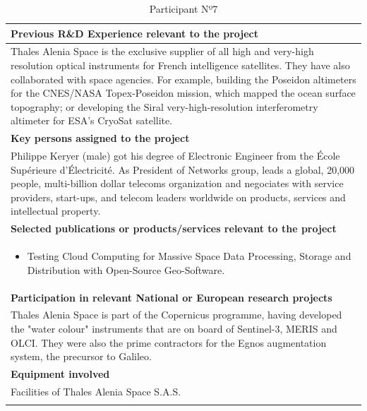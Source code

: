 \begin{longtable}[H]{|p{0.7cm}|p{4cm}|p{7cm}|p{1.3cm}|}
	\multicolumn{4}{|p{13cm}|}{\textbf{Previous R\&D Experience relevant to the project}}  \\ \hline
	
	\multicolumn{4}{|p{14.5cm}|}{Thales Alenia Space is the exclusive supplier of all high and very-high resolution optical instruments for French intelligence satellites. They have also collaborated with space agencies. For example, building the Poseidon altimeters for the CNES/NASA Topex-Poseidon mission, which mapped the ocean surface topography; or developing the Siral very-high-resolution interferometry altimeter for ESA's CryoSat satellite.}  \\ \hline
	
	\multicolumn{4}{|p{13cm}|}{\textbf{Key persons assigned to the project}}   \\ \hline
	
	\multicolumn{4}{|p{14.5cm}|}{Philippe Keryer (male) got his degree of Electronic Engineer from the École Supérieure d'Électricité. As President of Networks group, leads a global, 20,000 people, multi-billion dollar telecoms organization and negociates with service providers, start-ups, and telecom leaders worldwide on products, services and intellectual property.}  \\ \hline
	
	\multicolumn{4}{|p{13cm}|}{\textbf{Selected publications or products/services relevant to the project}}  \\ \hline
	
	\multicolumn{4}{|p{14.5cm}|}{
	\begin{itemize}
		\item Testing Cloud Computing for Massive Space Data Processing, Storage and Distribution with Open-Source Geo-Software.
	\end{itemize}}  \\ \hline
	
	\multicolumn{4}{|p{13cm}|}{\textbf{Participation in relevant National or European research projects}}  \\ \hline
	
	\multicolumn{4}{|p{14.5cm}|}{Thales Alenia Space is part of the Copernicus programme, having developed the "water colour" instruments that are on board of Sentinel-3, MERIS and OLCI. They were also the prime contractors for the Egnos augmentation system, the precursor to Galileo.}  \\ \hline
	
	\multicolumn{4}{|p{13cm}|}{\textbf{Equipment involved}}  \\ \hline
	
	\multicolumn{4}{|p{14.5cm}|}{Facilities of Thales Alenia Space S.A.S.}  \\ \hline
	\caption{Participant Nº7}
\end{longtable}



